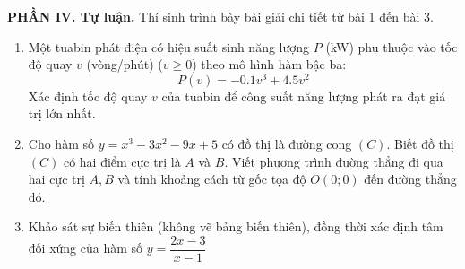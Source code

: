 \documentclass[12pt]{article}
\begin{document}
	\vspace{4mm}
	\noindent\textbf{PHẦN IV. Tự luận.} Thí sinh trình bày bài giải chi tiết từ bài 1 đến bài 3.
	\vspace{2mm}
	
	\begin{enumerate}[label=\textbf{Bài \arabic*.}, leftmargin=*]
		
		\item Một tuabin phát điện có hiệu suất sinh năng lượng $P$ (kW) phụ thuộc vào tốc độ quay $v$ (vòng/phút) ($v \ge 0$) theo mô hình hàm bậc ba:
		\[ P(v) = -0.1v^3 + 4.5v^2 \]
		Xác định tốc độ quay $v$ của tuabin để công suất năng lượng phát ra đạt giá trị lớn nhất.
		
		\vspace{2mm}
		\item Cho hàm số $y = x^3 - 3x^2 - 9x + 5$ có đồ thị là đường cong $(C)$. Biết đồ thị $(C)$ có hai điểm cực trị là $A$ và $B$. Viết phương trình đường thẳng đi qua hai cực trị $A, B$ và tính khoảng cách từ gốc tọa độ $O(0;0)$ đến đường thẳng đó.
		
		\vspace{2mm}
		\item Khảo sát sự biến thiên (không vẽ bảng biến thiên), đồng thời xác định tâm đối xứng của hàm số $y = \dfrac{2x - 3}{x - 1}$
		
	\end{enumerate}
	
\end{document}
